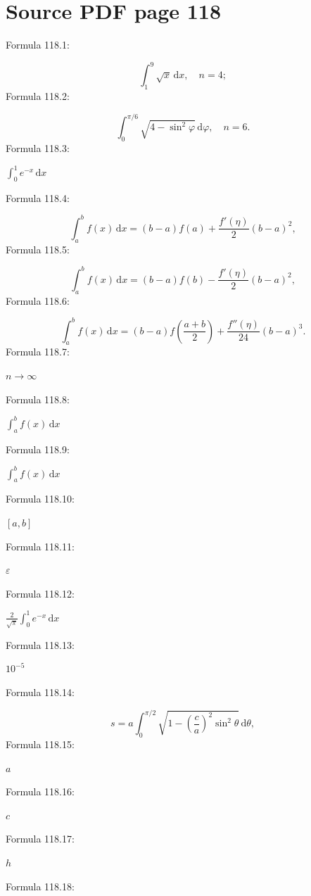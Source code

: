\documentclass[11pt]{article}
\begin{document}
\section*{Source PDF page 118}
\noindent Formula 118.1:\par
\[
\int_1^9\sqrt{x}\,\mathrm{d}x,\quad n=4;
\]
\noindent Formula 118.2:\par
\[
\int_0^{\pi/6}\sqrt{4-\sin^2\varphi}\,\mathrm{d}\varphi,\quad n=6.
\]
\noindent Formula 118.3:\par
$\displaystyle\int_0^1 e^{-x}\,\mathrm{d}x$\par
\noindent Formula 118.4:\par
\[
\int_a^b f(x)\,\mathrm{d}x=(b-a)f(a)+\frac{f'(\eta)}2(b-a)^2,
\]
\noindent Formula 118.5:\par
\[
\int_a^b f(x)\,\mathrm{d}x=(b-a)f(b)-\frac{f'(\eta)}2(b-a)^2,
\]
\noindent Formula 118.6:\par
\[
\int_a^b f(x)\,\mathrm{d}x=(b-a)f\left(\frac{a+b}2\right)+\frac{f''(\eta)}{24}(b-a)^3.
\]
\noindent Formula 118.7:\par
$n\to\infty$\par
\noindent Formula 118.8:\par
$\displaystyle\int_a^b f(x)\,\mathrm{d}x$\par
\noindent Formula 118.9:\par
$\displaystyle\int_a^b f(x)\,\mathrm{d}x$\par
\noindent Formula 118.10:\par
$[a,b]$\par
\noindent Formula 118.11:\par
$\varepsilon$\par
\noindent Formula 118.12:\par
$\displaystyle\frac2{\sqrt\pi}\int_0^1 e^{-x}\,\mathrm{d}x$\par
\noindent Formula 118.13:\par
$10^{-5}$\par
\noindent Formula 118.14:\par
\[
s=a\int_0^{\pi/2}\sqrt{1-\left(\frac ca\right)^2\sin^2\theta}\,\mathrm{d}\theta,
\]
\noindent Formula 118.15:\par
$a$\par
\noindent Formula 118.16:\par
$c$\par
\noindent Formula 118.17:\par
$h$\par
\noindent Formula 118.18:\par
\end{document}
